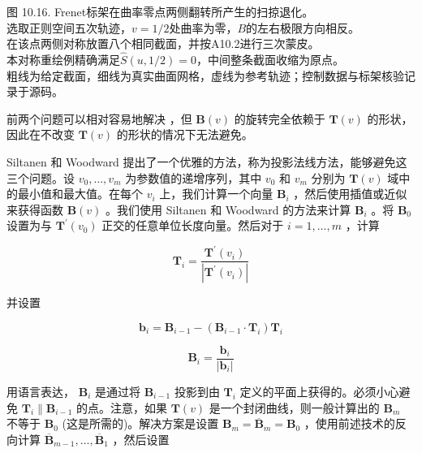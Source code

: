 \documentclass[../main.tex]{subfiles}
\begin{document}
\begin{center}
\begin{minipage}{26cm}
\vspace*{.6\baselineskip}
\centering
{}
\par\smallskip
图 10.16. Frenet标架在曲率零点两侧翻转所产生的扫掠退化。\\
选取正则空间五次轨迹，$v=1/2$处曲率为零，$B$的左右极限方向相反。\\
在该点两侧对称放置八个相同截面，并按A10.2进行三次蒙皮。\\
本对称重绘例精确满足$\widehat S(u,1/2)=0$，中间整条截面收缩为原点。\\
粗线为给定截面，细线为真实曲面网格，虚线为参考轨迹；控制数据与标架核验记录于源码。
\end{minipage}
\end{center}

前两个问题可以相对容易地解决 \cite{Klok86,Bron92,Silt92}，但 \(\mathbf{B}\left( v\right)\) 的旋转完全依赖于 \(\mathbf{T}\left( v\right)\) 的形状，因此在不改变 \(\mathbf{T}\left( v\right)\) 的形状的情况下无法避免。

Siltanen 和 Woodward \cite{Silt92} 提出了一个优雅的方法，称为投影法线方法，能够避免这三个问题。设 \({v}_{0},\ldots ,{v}_{m}\) 为参数值的递增序列，其中 \({v}_{0}\) 和 \({v}_{m}\) 分别为 \(\mathbf{T}\left( v\right)\) 域中的最小值和最大值。在每个 \({v}_{i}\) 上，我们计算一个向量 \({\mathbf{B}}_{i}\) ，然后使用插值或近似来获得函数 \(\mathbf{B}\left( v\right)\) 。我们使用 Siltanen 和 Woodward 的方法来计算 \({\mathbf{B}}_{i}\) 。将 \({\mathbf{B}}_{0}\) 设置为与 \({\mathbf{T}}^{\prime }\left( {v}_{0}\right)\) 正交的任意单位长度向量。然后对于 \(i = 1,\ldots ,m\) ，计算

\[
{\mathbf{T}}_{i} = \frac{{\mathbf{T}}^{\prime }\left( {v}_{i}\right) }{\left| {\mathbf{T}}^{\prime }\left( {v}_{i}\right) \right| }
\]

并设置

\[
{\mathbf{b}}_{i} = {\mathbf{B}}_{i - 1} - \left( {{\mathbf{B}}_{i - 1} \cdot  {\mathbf{T}}_{i}}\right) {\mathbf{T}}_{i}
\]

\[
{\mathbf{B}}_{i} = \frac{{\mathbf{b}}_{i}}{\left| {\mathbf{b}}_{i}\right| } \tag{10.27}
\]

用语言表达， \({\mathbf{B}}_{i}\) 是通过将 \({\mathbf{B}}_{i - 1}\) 投影到由 \({\mathbf{T}}_{i}\) 定义的平面上获得的。必须小心避免 \({\mathbf{T}}_{i}\parallel {\mathbf{B}}_{i - 1}\) 的点。注意，如果 \(\mathbf{T}\left( v\right)\) 是一个封闭曲线，则一般计算出的 \({\mathbf{B}}_{m}\) 不等于 \({\mathbf{B}}_{0}\) (这是所需的)。解决方案是设置 \({\mathbf{B}}_{m} = {\overline{\mathbf{B}}}_{m} = {\mathbf{B}}_{0}\) ，使用前述技术的反向计算 \({\overline{\mathbf{B}}}_{m - 1},\ldots ,{\overline{\mathbf{B}}}_{1}\) ，然后设置
\end{document}
